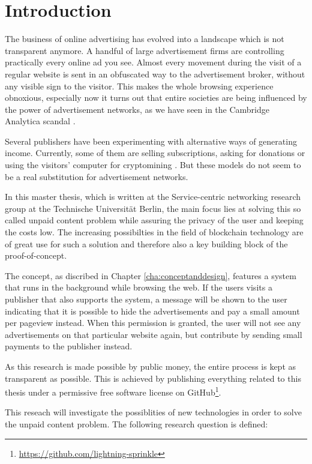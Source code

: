 \chapter{Introduction}
\label{cha:introduction}

The business of online advertising has evolved into a landscape which is not transparent anymore. A handful of large advertisement firms are controlling practically every online ad you see. Almost every movement during the visit of a regular website is sent in an obfuscated way to the advertisement broker, without any visible sign to the visitor. This makes the whole browsing experience obnoxious, especially now it turns out that entire societies are being influenced by the power of advertisement networks, as we have seen in the Cambridge Analytica scandal \cite{cadwalladr2018cambridge}.

Several publishers have been experimenting with alternative ways of generating income. Currently, some of them are selling subscriptions, asking for donations or using the visitors' computer for cryptomining \cite{ruth2018digging}. But these models do not seem to be a real substitution for advertisement networks. 

In this master thesis, which is written at the Service-centric networking research group at the Technische Universität Berlin, the main focus lies at solving this so called unpaid content problem while assuring the privacy of the user and keeping the costs low. The increasing possibilties in the field of blockchain technology are of great use for such a solution and therefore also a key building block of the proof-of-concept.

The concept, as discribed in Chapter \ref{cha:conceptanddesign}, features a system that runs in the background while browsing the web. If the users visits a publisher that also supports the system, a message will be shown to the user indicating that it is possible to hide the advertisements and pay a small amount per pageview instead. When this permission is granted, the user will not see any advertisements on that particular website again, but contribute by sending small payments to the publisher instead.

As this research is made possible by public money, the entire process is kept as transparent as possible. This is achieved by publishing everything related to this thesis under a permissive free software license on GitHub\footnote{\url{https://github.com/lightning-sprinkle}}.

This reseach will investigate the possiblities of new technologies in order to solve the unpaid content problem. The following research question is defined:
\vspace{1em}

